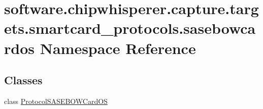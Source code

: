 \hypertarget{namespacesoftware_1_1chipwhisperer_1_1capture_1_1targets_1_1smartcard__protocols_1_1sasebowcardos}{}\section{software.\+chipwhisperer.\+capture.\+targets.\+smartcard\+\_\+protocols.\+sasebowcardos Namespace Reference}
\label{namespacesoftware_1_1chipwhisperer_1_1capture_1_1targets_1_1smartcard__protocols_1_1sasebowcardos}
\subsection*{Classes}
\begin{DoxyCompactItemize}
\item 
class \hyperlink{classsoftware_1_1chipwhisperer_1_1capture_1_1targets_1_1smartcard__protocols_1_1sasebowcardos_1_1ProtocolSASEBOWCardOS}{Protocol\+S\+A\+S\+E\+B\+O\+W\+Card\+O\+S}
\end{DoxyCompactItemize}
